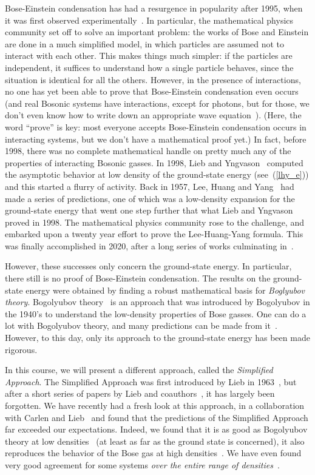 \documentclass{ian}
\begin{document}
\point
Bose-Einstein condensation has had a resurgence in popularity after 1995, when it was first observed experimentally\-~\cite{AEe95,DMe95}.
In particular, the mathematical physics community set off to solve an important problem: the works of Bose and Einstein are done in a much simplified model, in which particles are assumed not to interact with each other.
This makes things much simpler: if the particles are independent, it suffices to understand how a single particle behaves, since the situation is identical for all the others.
However, in the presence of interactions, no one has yet been able to prove that Bose-Einstein condensation even occurs (and real Bosonic systems have interactions, except for photons, but for those, we don't even know how to write down an appropriate wave equation\-~\cite{Op31}).
(Here, the word ``prove'' is key: most everyone accepts Bose-Einstein condensation occurs in interacting systems, but we don't have a mathematical proof yet.)
In fact, before 1998, there was no complete mathematical handle on pretty much any of the properties of interacting Bosonic gasses.
In 1998, Lieb and Yngvason\-~\cite{LY98} computed the asymptotic behavior at low density of the ground-state energy (see\-~(\ref{lhy_e})) and this started a flurry of activity.
Back in 1957, Lee, Huang and Yang\-~\cite{LHY57} had made a series of predictions, one of which was a low-density expansion for the ground-state energy that went one step further that what Lieb and Yngvason proved in 1998.
The mathematical physics community rose to the challenge, and embarked upon a twenty year effort to prove the Lee-Huang-Yang formula.
This was finally accomplished in 2020, after a long series of works culminating in\-~\cite{YY09,FS20,BCS21,FS23}.
\bigskip

\indent
However, these successes only concern the ground-state energy.
In particular, there still is no proof of Bose-Einstein condensation.
The results on the ground-state energy were obtained by finding a robust mathematical basis for {\it Boglyubov theory}.
Bogolyubov theory\-~\cite{Bo47} is an approach that was introduced by Bogolyubov in the 1940's to understand the low-density properties of Bose gasses.
One can do a lot with Bogolyubov theory, and many predictions can be made from it\-~\cite{LHY57}.
However, to this day, only its approach to the ground-state energy has been made rigorous.
\bigskip

\indent
In this course, we will present a different approach, called the {\it Simplified Approach}.
The Simplified Approach was first introduced by Lieb in 1963\-~\cite{Li63}, but after a short series of papers by Lieb and coauthors\-~\cite{LS64,LL64}, it has largely been forgotten.
We have recently had a fresh look at this approach, in a collaboration with Carlen and Lieb\-~\cite{CJL20,CJL21,CHe21,Ja22,Ja23,Ja23b} and found that the predictions of the Simplified Approach far exceeded our expectations.
Indeed, we found that it is as good as Bogolyubov theory at low densities\-~\cite{CJL20,CJL21} (at least as far as the ground state is concerned), it also reproduces the behavior of the Bose gas at high densities\-~\cite{CJL20}.
We have even found very good agreement for some systems {\it over the entire range of densities}\-~\cite{CHe21,Ja23b}.
\bigskip
\end{document}
